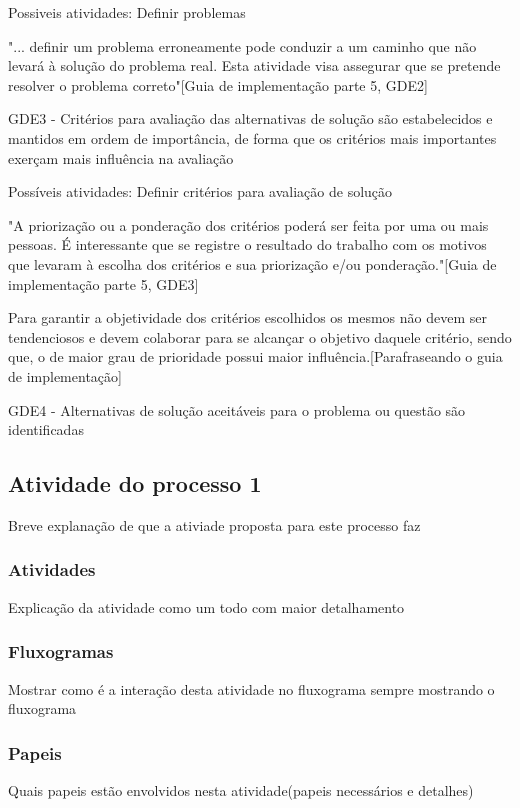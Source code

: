 \documentclass{article}
\begin{document}
		Possiveis atividades:
			Definir problemas
			
	"... definir um problema erroneamente pode conduzir a um caminho que não levará à solução do problema real. Esta atividade visa assegurar que se pretende resolver o problema correto"[Guia de implementação parte 5, GDE2]

	GDE3 - Critérios para avaliação das alternativas de solução são estabelecidos e mantidos em ordem de importância, de forma que os critérios mais importantes exerçam mais influência na avaliação
		
		Possíveis atividades:
			Definir critérios para avaliação de solução
			
		"A priorização ou a ponderação dos critérios poderá ser feita por uma ou mais pessoas. É interessante que se registre o resultado do trabalho com os motivos que levaram à escolha dos critérios e sua priorização e/ou ponderação."[Guia de implementação parte 5, GDE3]
		
		Para garantir a objetividade dos critérios escolhidos os mesmos não devem ser tendenciosos e devem colaborar para se alcançar o objetivo daquele critério, sendo que, o de maior grau de prioridade possui maior influência.[Parafraseando o guia de implementação]

	GDE4 - Alternativas de solução aceitáveis para o problema ou questão são identificadas
		
				
		
	\subsection{Atividade do processo 1}
		Breve explanação de que a ativiade proposta para este processo faz
		
		\subsubsection{Atividades}
			Explicação da atividade como um todo com maior detalhamento
		\subsubsection{Fluxogramas}
			Mostrar como é a interação desta atividade no fluxograma sempre mostrando o fluxograma
		\subsubsection{Papeis}
			Quais papeis estão envolvidos nesta atividade(papeis necessários e detalhes)
\end{document}
